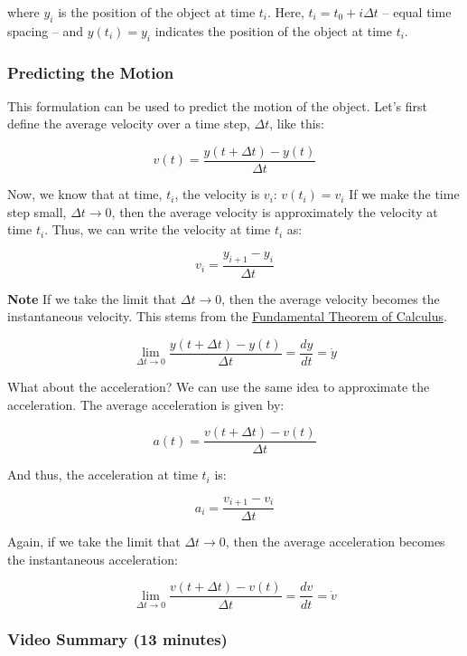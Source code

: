 \documentclass[11pt]{article}
\begin{document}
where \(y_i\) is the position of the object at time \(t_i\). Here,
\(t_i = t_0 + i\Delta t\) -- equal time spacing -- and \(y(t_i) = y_i\)
indicates the position of the object at time \(t_i\).

\subsubsection{Predicting the Motion}\label{predicting-the-motion}

This formulation can be used to predict the motion of the object. Let's
first define the average velocity over a time step, \(\Delta t\), like
this:

\[v(t) = \dfrac{y(t+\Delta t) - y(t)}{\Delta t}\]

Now, we know that at time, \(t_i\), the velocity is \(v_i\):
\(v(t_i) = v_i\) If we make the time step small,
\(\Delta t \rightarrow 0\), then the average velocity is approximately
the velocity at time \(t_i\). Thus, we can write the velocity at time
\(t_{i}\) as:

\[v_{i} = \dfrac{y_{i+1} - y_i}{\Delta t}\]

\textbf{Note} If we take the limit that \(\Delta t \rightarrow 0\), then
the average velocity becomes the instantaneous velocity. This stems from
the
\href{https://en.wikipedia.org/wiki/Fundamental_theorem_of_calculus}{Fundamental
Theorem of Calculus}.

\[\lim_{\Delta t \rightarrow 0} \dfrac{y(t+\Delta t) - y(t)}{\Delta t} = \dfrac{dy}{dt} = \dot{y}\]

What about the acceleration? We can use the same idea to approximate the
acceleration. The average acceleration is given by:

\[a(t) = \dfrac{v(t+\Delta t) - v(t)}{\Delta t}\]

And thus, the acceleration at time \(t_i\) is:

\[a_i = \dfrac{v_{i+1} - v_i}{\Delta t}\]

Again, if we take the limit that \(\Delta t \rightarrow 0\), then the
average acceleration becomes the instantaneous acceleration:

\[\lim_{\Delta t \rightarrow 0} \dfrac{v(t+\Delta t) - v(t)}{\Delta t} = \dfrac{dv}{dt} = \dot{v}\]

\subsubsection{Video Summary (13
minutes)}\label{video-summary-13-minutes}
\end{document}
